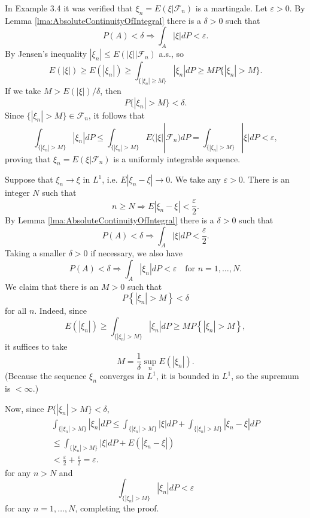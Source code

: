 \begin{Solution}
\label{sol:Exercise45}
In Example 3.4 it was verified that $\xi_{n} = E(\xi|\mathcal{F}_{n})$ is a martingale. Let $\varepsilon > 0$. By Lemma \ref{lma:AbsoluteContinuityOfIntegral} there is a $\delta > 0$ such that
\[
P (A) < \delta \Longrightarrow \int_{A} | \xi | d P < \varepsilon .
\]
By Jensen's inequality $|\xi_n| \leq E(|\xi||\mathcal{F}_n)$ a.s., so
\[
E (| \xi |) \geq E (| \xi_{n} |) \geq \int_{\{|\xi_{n}| \geq M\}} | \xi_{n} | d P \geq M P \{|\xi_{n}| > M\}.
\]
If we take $M > E(|\xi|) / \delta$, then
\[
P \{|\xi_{n}| > M\} < \delta .
\]
Since $\{|\xi_n| > M\} \in \mathcal{F}_n$, it follows that
\[
\int_{\{|\xi_{n}| > M\}} | \xi_{n} | d P \leq \int_{\{|\xi_{n}| > M\}} E (| \xi | | \mathcal{F}_{n}) d P = \int_{\{|\xi_{n}| > M\}} | \xi | d P < \varepsilon ,
\]
proving that $\xi_{n} = E(\xi |\mathcal{F}_{n})$ is a uniformly integrable sequence.
\end{Solution}

\begin{Proof}
Suppose that $\xi_{n} \to \xi$ in $L^{1}$, i.e. $E|\xi_{n} - \xi| \to 0$. We take any $\varepsilon > 0$. There is an integer $N$ such that
\[
n \geq N \Longrightarrow E | \xi_{n} - \xi | < \frac{\varepsilon}{2}.
\]
By Lemma \ref{lma:AbsoluteContinuityOfIntegral} there is a $\delta > 0$ such that
\[
P (A) < \delta \Longrightarrow \int_{A} | \xi | d P < \frac{\varepsilon}{2}.
\]
Taking a smaller $\delta > 0$ if necessary, we also have
\[
P (A) < \delta \Longrightarrow \int_{A} | \xi_{n} | d P < \varepsilon \quad \text{for } n = 1, \dots , N.
\]
We claim that there is an $M > 0$ such that
\[
P \left\{\left| \xi_{n} \right| > M \right\} < \delta
\]
for all $n$. Indeed, since
\[
E \left(| \xi_{n} |\right) \geq \int_{\{| \xi_{n} | > M \}} | \xi_{n} | d P \geq M P \left\{| \xi_{n} | > M \right\},
\]
it suffices to take
\[
M = \frac{1}{\delta} \sup_{n} E (| \xi_{n} |).
\]
(Because the sequence $\xi_{n}$ converges in $L^1$, it is bounded in $L^1$, so the supremum is $< \infty$.)

Now, since $P\{|\xi_n| > M\} < \delta$,
\[
\begin{array}{l}
\int_{\{| \xi_{n} | > M \}} | \xi_{n} | d P \leq \int_{\{| \xi_{n} | > M \}} | \xi | d P + \int_{\{| \xi_{n} | > M \}} | \xi_{n} - \xi | d P \\
\leq \int_{\{| \xi_{n} | > M \}} | \xi | d P + E (| \xi_{n} - \xi |) \\
< \frac{\varepsilon}{2} + \frac{\varepsilon}{2} = \varepsilon .
\end{array}
\]
for any $n > N$ and
\[
\int_{\{| \xi_{n} | > M \}} | \xi_{n} | d P < \varepsilon
\]
for any $n = 1, \ldots, N$, completing the proof.
\end{Proof}


